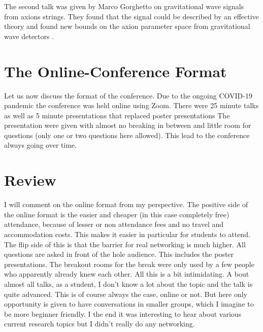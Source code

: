 \documentclass[a4paper]{article}
\begin{document}
\noindent
The second talk was given by Marco Gorghetto on gravitational wave signals
from axions strings. They found that the signal could be described by an effective theory
and found new bounds on the axion parameter space from gravitational wave detectors \cite{Gorghetto_2021}.

\section{The Online-Conference Format}
Let us now discuss the format of the conference.
Due to the ongoing COVID-19 pandemic the conference was held online using Zoom.
There were 25 minute talks as well as 5 minute presentations that replaced poster presentations
The presentation were given with almost no breaking in between and little room for questions (only one or two
questions here allowed). This lead to the conference always going over time.

\section{Review}
I will comment on the online format from my perspective.
The positive side of the online format is the easier and cheaper (in this case completely free)
attendance, because of lesser or non attendance fees and no travel and accommodation costs.
This makes it easier in particular for students to attend.
The flip side of this is that the barrier for real networking is much higher.
All questions are asked in front of the hole audience. This includes the
poster presentations. The breakout rooms for the break were only used by a few people who apparently already knew
each other.
All this is a bit intimidating. A bout almost all
talks, as a student, I don't know a lot about the topic and the talk is quite advanced.
This is of course always the case, online or not. But here only opportunity is given to have
conversations in smaller groups, which I imagine to be more beginner friendly.
I the end it was interesting to hear about various current research topics but
I didn't really do any networking.


\newpage
\printbibliography
\end{document}
